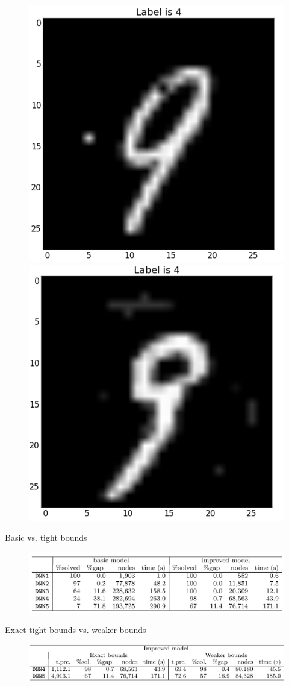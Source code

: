 \documentclass{beamer}
\begin{document}
\begin{frame}
  \begin{figure}
    \centering
    \includegraphics[width=0.48\columnwidth]{9-free.png}
    \includegraphics[width=0.48\columnwidth]{9-limited.png}
  \end{figure}
\end{frame}

\begin{frame}{Basic vs. tight bounds}
  \begin{figure}
    \centering
    \includegraphics[width=\columnwidth]{tab-1.png}
  \end{figure}
\end{frame}

\begin{frame}{Exact tight bounds vs. weaker bounds}
  \begin{figure}
    \centering
    \includegraphics[width=\columnwidth]{tab-2.png}
  \end{figure}
\end{frame}
\end{document}
